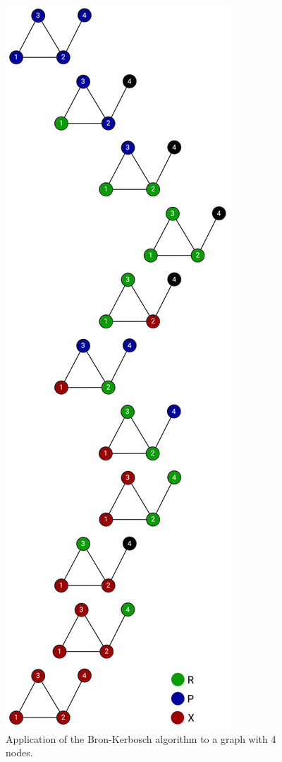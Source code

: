 \documentclass[11pt]{article}
\begin{document}
\begin{figure}[p]
\centering
\includegraphics[scale=0.9]{img/ex_bk_classic.png}
\caption{Application of the Bron-Kerbosch algorithm to a graph with 4
nodes.}
\label{fig:bkc}
\end{figure}
\end{document}
